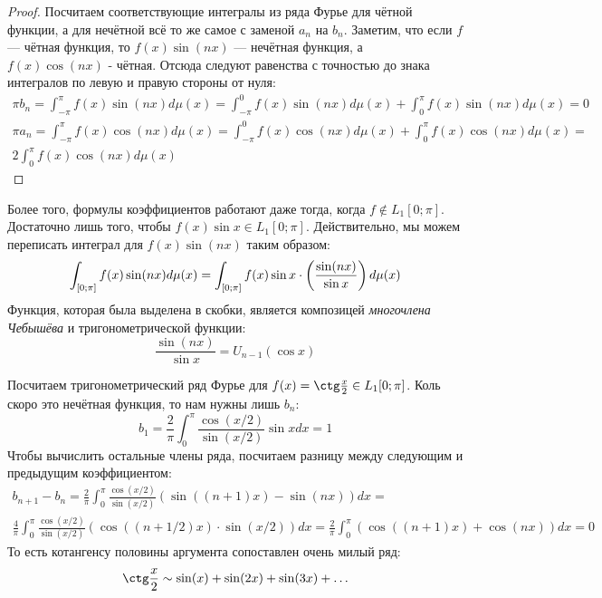 \begin{proof}
	Посчитаем соответствующие интегралы из ряда Фурье для чётной функции, а для нечётной всё то же самое с заменой $a_n$ на $b_n$. Заметим, что если $f$ --- чётная функция, то $f(x)\sin(nx)$ --- нечётная функция, а $f(x)\cos(nx)$ - чётная. Отсюда следуют равенства с точностью до знака интегралов по левую и правую стороны от нуля:
	\begin{multline*}
		\pi b_n = \int_{-\pi}^\pi f(x)\sin(nx)d\mu(x) = \int_{-\pi}^0 f(x)\sin(nx)d\mu(x) + \int_0^\pi f(x)\sin(nx)d\mu(x) = 0 \\
		\pi a_n = \int_{-\pi}^\pi f(x)\cos(nx)d\mu(x) = \int_{-\pi}^0 f(x)\cos(nx)d\mu(x) + \int_0^\pi f(x)\cos(nx)d\mu(x) = \\ 2 \int_0^\pi f(x)\cos(nx)d\mu(x) 
	\end{multline*}
\end{proof}

\begin{note}
	Более того, формулы коэффициентов работают даже тогда, когда $f \notin L_1[0; \pi]$. Достаточно лишь того, чтобы $f(x)\sin x \in L_1[0; \pi]$. Действительно, мы можем переписать интеграл для $f(x)\sin(nx)$ таким образом:
	\[
		\int_{[0; \pi]} f(x)\sin(nx)d\mu(x) = \int_{[0; \pi]} f(x)\sin x \cdot \left(\frac{\sin(nx)}{\sin x}\right)d\mu(x)
	\]
	Функция, которая была выделена в скобки, является композицей \textit{многочлена Чебышёва} и тригонометрической функции:
	\[
		\frac{\sin(nx)}{\sin x} = U_{n - 1}(\cos x)
	\]
\end{note}

\begin{example}
	Посчитаем тригонометрический ряд Фурье для $f(x) = \ctg \frac{x}{2} \in L_1[0; \pi]$. Коль скоро это нечётная функция, то нам нужны лишь $b_n$:
	\[
		b_1 = \frac{2}{\pi} \int_0^\pi \frac{\cos(x / 2)}{\sin(x / 2)} \sin xdx = 1
	\]
	Чтобы вычислить остальные члены ряда, посчитаем разницу между следующим и предыдущим коэффициентом:
	\begin{multline*}
		b_{n + 1} - b_n = \frac{2}{\pi} \int_0^\pi \frac{\cos(x / 2)}{\sin(x / 2)}(\sin((n + 1)x) - \sin(nx))dx =
		\\
		\frac{4}{\pi}\int_0^\pi \frac{\cos(x / 2)}{\sin(x / 2)}(\cos((n + 1/2)x) \cdot \sin(x / 2))dx = \frac{2}{\pi}\int_0^\pi (\cos((n + 1)x) + \cos(nx))dx = 0
	\end{multline*}
	То есть котангенсу половины аргумента сопоставлен очень милый ряд:
	\[
		\ctg \frac{x}{2} \sim \sin(x) + \sin(2x) + \sin(3x) + \ldots
	\]
\end{example}

